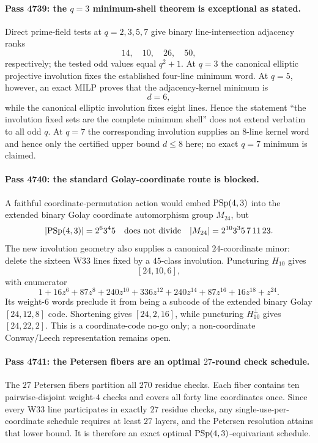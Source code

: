 \paragraph{Pass 4739: the $q=3$ minimum-shell theorem is exceptional as stated.}
Direct prime-field tests at $q=2,3,5,7$ give binary line-intersection adjacency
ranks
\[
 14,\quad 10,\quad 26,\quad 50,
\]
respectively; the tested odd values equal $q^2+1$.  At $q=3$ the canonical
elliptic projective involution fixes the established four-line minimum word.
At $q=5$, however, an exact MILP proves that the adjacency-kernel minimum is
\[
 \boxed{d=6},
\]
while the canonical elliptic involution fixes eight lines.  Hence the statement
``the involution fixed sets are the complete minimum shell'' does not extend
verbatim to all odd $q$.  At $q=7$ the corresponding involution supplies an
$8$-line kernel word and hence only the certified upper bound $d\leq8$ here;
no exact $q=7$ minimum is claimed.

\paragraph{Pass 4740: the standard Golay-coordinate route is blocked.}
A faithful coordinate-permutation action would embed $\mathrm{PSp}(4,3)$ into the
extended binary Golay coordinate automorphism group $M_{24}$, but
\[
 |\mathrm{PSp}(4,3)|=2^6 3^4 5
 \quad\hbox{does not divide}\quad
 |M_{24}|=2^{10}3^3 5\,7\,11\,23.
\]
The new involution geometry also supplies a canonical $24$-coordinate minor:
delete the sixteen W33 lines fixed by a $45$-class involution.  Puncturing
$H_{10}$ gives
\[
 \boxed{[24,10,6]},
\]
with enumerator
\[
 1+16z^6+87z^8+240z^{10}+336z^{12}+240z^{14}
 +87z^{16}+16z^{18}+z^{24}.
\]
Its weight-$6$ words preclude it from being a subcode of the extended binary
Golay $[24,12,8]$ code.  Shortening gives $[24,2,16]$, while puncturing
$H_{10}^{\perp}$ gives $[24,22,2]$.  This is a coordinate-code no-go only; a
non-coordinate Conway/Leech representation remains open.

\paragraph{Pass 4741: the Petersen fibers are an optimal $27$-round check schedule.}
The $27$ Petersen fibers partition all $270$ residue checks.  Each fiber contains
ten pairwise-disjoint weight-$4$ checks and covers all forty line coordinates
once.  Since every W33 line participates in exactly $27$ residue checks, any
single-use-per-coordinate schedule requires at least $27$ layers, and the
Petersen resolution attains that lower bound.  It is therefore an exact optimal
$\mathrm{PSp}(4,3)$-equivariant schedule.


